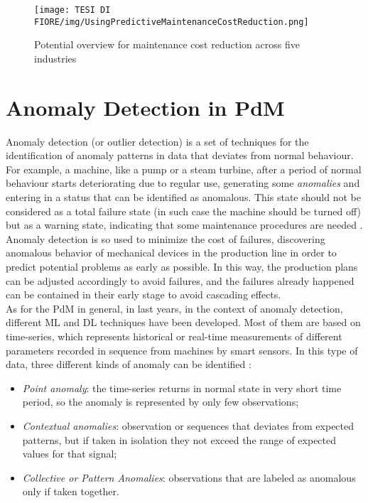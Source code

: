 \begin{figure}[ht]
\texttt{[image: TESI DI FIORE/img/UsingPredictiveMaintenanceCostReduction.png]}
\centering
\caption{Potential overview for maintenance cost reduction across five industries \cite{11PorscheStudy}}
\label{predictive_maintenance_reduction_costs}
\end{figure}


\section{Anomaly Detection in PdM}
Anomaly detection (or outlier detection) is a set of techniques for the identification of anomaly patterns in data that deviates from normal behaviour. For example, a machine, like a pump or a steam turbine, after a period of normal behaviour starts deteriorating due to regular use, generating some \textit{anomalies} and entering in a status that can be identified as anomalous. This state should not be considered as a total failure state (in such case the machine should be turned off) but as a warning state, indicating that some maintenance procedures are needed \cite{5AnomalyDetectionSurvey}. Anomaly detection is so used to minimize the cost of failures, discovering anomalous behavior of mechanical devices in the production line in order to predict potential problems as early as possible. In this way, the production plans can be adjusted accordingly to avoid failures, and the failures already happened can be contained in their early stage to avoid cascading effects.\\
As for the PdM in general, in last years, in the context of anomaly detection, different ML and DL techniques have been developed. Most of them are based on time-series, which represents historical or real-time measurements of different parameters recorded in sequence from machines by smart sensors. In this type of data, three different kinds of anomaly can be identified \cite{6AnomalyIoTTimeSeries}: 
\begin{itemize}
\item{\textit{Point anomaly}: the time-series returns in normal state in very short time period, so the anomaly is represented by only few observations;}
\item{\textit{Contextual anomalies}: observation or sequences that deviates from expected patterns, but if taken in isolation they not exceed the range of expected values for that signal;}
\item{\textit{Collective or Pattern Anomalies}: observations that are labeled as anomalous only if taken together.}
\end{itemize}
